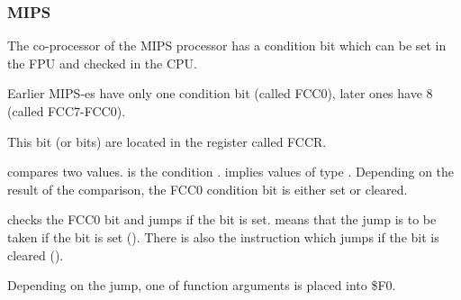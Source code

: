 \subsubsection{MIPS}

The co-processor of the MIPS processor has a condition bit which can be set in the FPU and checked in the CPU.

Earlier MIPS-es have only one condition bit (called FCC0), later ones have 8 (called FCC7-FCC0).

This bit (or bits) are located in the register called FCCR.



 compares two values. 
 is the condition .
 implies values of type \Tdouble.
Depending on the result of the comparison, the FCC0 condition bit is either set or cleared.

 checks the FCC0 bit and jumps if the bit is set.
 means that the jump is to be taken if the bit is set ().
There is also the instruction  which jumps if the bit is cleared ().

Depending on the jump, one of function arguments is placed into \$F0.
